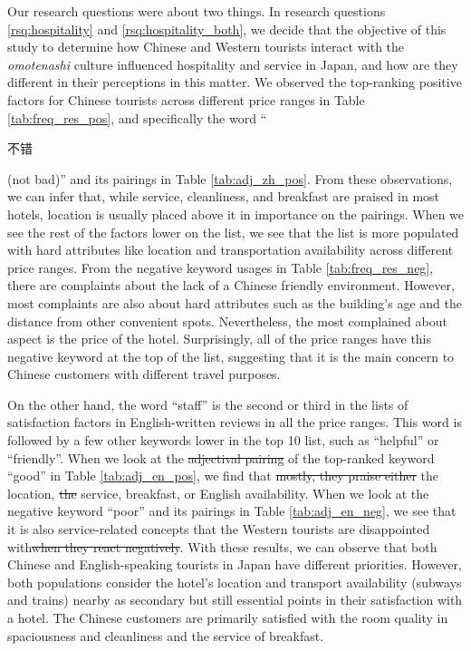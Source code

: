 \documentclass[smallextended,natbib]{svjour3}       %
\providecommand{\DIFadd}[1]{{\protect\color{blue}\uwave{#1}}} %
\providecommand{\DIFdel}[1]{{\protect\color{red}\sout{#1}}}                      %
\providecommand{\DIFaddbegin}{} %
\providecommand{\DIFaddend}{} %
\providecommand{\DIFdelbegin}{} %
\providecommand{\DIFdelend}{} %
\newcommand{\DIFscaledelfig}{0.5}
\newlength{\DIFdelgraphicswidth} %
\newlength{\DIFdelgraphicsheight} %
\newcommand{\DIFaddincludegraphics}[2][]{{\color{blue}\fbox{\DIFOincludegraphics[#1]{#2}}}} %
\newcommand{\DIFdelincludegraphics}[2][]{%
\sbox{\DIFdelgraphicsbox}{\DIFOincludegraphics[#1]{#2}}%
\settoboxwidth{\DIFdelgraphicswidth}{\DIFdelgraphicsbox} %
\settoboxtotalheight{\DIFdelgraphicsheight}{\DIFdelgraphicsbox} %
\scalebox{\DIFscaledelfig}{%
\parbox[b]{\DIFdelgraphicswidth}{\usebox{\DIFdelgraphicsbox}\\[-\baselineskip] \rule{\DIFdelgraphicswidth}{0em}}\llap{\resizebox{\DIFdelgraphicswidth}{\DIFdelgraphicsheight}{%
\setlength{\unitlength}{\DIFdelgraphicswidth}%
\begin{picture}(1,1)%
\thicklines\linethickness{2pt} %
{\color[rgb]{1,0,0}\put(0,0){\framebox(1,1){}}}%
{\color[rgb]{1,0,0}\put(0,0){\line( 1,1){1}}}%
{\color[rgb]{1,0,0}\put(0,1){\line(1,-1){1}}}%
\end{picture}%
}\hspace*{3pt}}} %
} %
\DeclareRobustCommand{\DIFaddbegin}{\DIFOaddbegin \let\includegraphics\DIFaddincludegraphics} %
\DeclareRobustCommand{\DIFaddend}{\DIFOaddend \let\includegraphics\DIFOincludegraphics} %
\DeclareRobustCommand{\DIFdelbegin}{\DIFOdelbegin \let\includegraphics\DIFdelincludegraphics} %
\DeclareRobustCommand{\DIFdelend}{\DIFOaddend \let\includegraphics\DIFOincludegraphics} %
\begin{document}
    Our research questions were about two things. In research questions \ref{rsq:hospitality} and \ref{rsq:hospitality_both}, we decide that the objective of this study to determine how Chinese and Western tourists interact with the \textit{omotenashi} culture influenced hospitality and service in Japan, and how are they different in their perceptions in this matter. We observed the top-ranking positive factors for Chinese tourists across different price ranges in Table \ref{tab:freq_res_pos}, and specifically the word ``\begin{CJK}{UTF8}{gbsn}不错\end{CJK} (not bad)'' and its pairings in Table \ref{tab:adj_zh_pos}. From these observations, we can infer that, while service, cleanliness, and breakfast are praised in most hotels, location is usually placed above it in importance on the pairings. When we see the rest of the factors lower on the list, we see that the list is more populated with hard attributes like location and transportation availability across different price ranges. From the negative keyword usages in Table \ref{tab:freq_res_neg}, there are complaints about the lack of a Chinese friendly environment. However, most complaints are also about hard attributes such as the building's age and the distance from other convenient spots. Nevertheless, the most complained about aspect is the price of the hotel. Surprisingly, all of the price ranges have this negative keyword at the top of the list, suggesting that it is the main concern to Chinese customers with different travel purposes.

    On the other hand, the word ``staff'' is the second or third in the lists of satisfaction factors in English-written reviews in all the price ranges. This word is followed by a few other keywords lower in the top 10 list, such as ``helpful'' or ``friendly''. When we look at the \DIFdelbegin \DIFdel{adjectival pairing }\DIFdelend \DIFaddbegin \DIFadd{pairings }\DIFaddend of the top-ranked keyword ``good'' in Table \ref{tab:adj_en_pos}, we find that \DIFdelbegin \DIFdel{mostly, they praise either }\DIFdelend \DIFaddbegin \DIFadd{customers mostly praise }\DIFaddend the location, \DIFdelbegin \DIFdel{the }\DIFdelend service, breakfast, or English availability. When we look at the negative keyword ``poor'' and its pairings in Table \ref{tab:adj_en_neg}, we see that it is also service-related concepts that the Western tourists are disappointed with\DIFdelbegin \DIFdel{when they react negatively}\DIFdelend . With these results, we can observe that both Chinese and English-speaking tourists in Japan have different priorities. However, both populations consider the hotel's location and transport availability (subways and trains) nearby as secondary but still essential points in their satisfaction with a hotel. The Chinese customers are primarily satisfied with the room quality in spaciousness and cleanliness and the service of breakfast.
\end{document}
